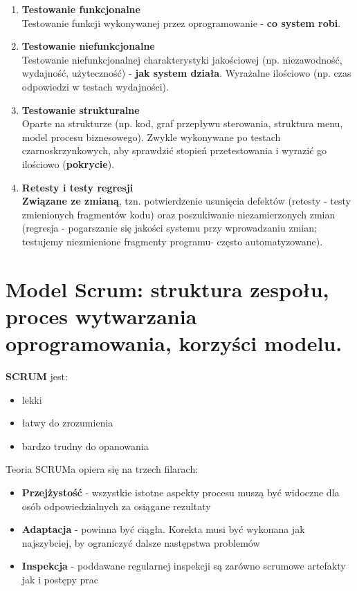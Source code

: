 \documentclass[12pt]{article}
\begin{document}
    \begin{enumerate}
        \item  \textbf{Testowanie funkcjonalne}\\
        Testowanie funkcji wykonywanej przez oprogramowanie - \textbf{co system robi}.

        \item \textbf{Testowanie niefunkcjonalne}\\
        Testowanie niefunkcjonalnej charakterystyki jakościowej (np. niezawodność, wydajność,
        użyteczność) - \textbf{jak system działa}. Wyrażalne ilościowo (np. czas odpowiedzi w testach wydajności).

        \item \textbf{Testowanie strukturalne}\\
        Oparte na strukturze (np. kod, graf przepływu sterowania, struktura menu, model procesu biznesowego).
        Zwykle wykonywane po testach czarnoskrzynkowych, aby sprawdzić stopień przetestowania i wyrazić go ilościowo
        (\textbf{pokrycie}).

        \item \textbf{Retesty i testy regresji}\\
        \textbf{Związane ze zmianą}, tzn. potwierdzenie usunięcia defektów (retesty - testy zmienionych fragmentów kodu)
        oraz poszukiwanie niezamierzonych zmian (regresja - pogarszanie się jakości systemu przy wprowadzaniu zmian;
        testujemy niezmienione fragmenty programu- często automatyzowane).
    \end{enumerate}

    \newpage

    \section{Model Scrum: struktura zespołu, proces wytwarzania oprogramowania, korzyści modelu.}
    \begin{definition}
        \textbf{SCRUM} jest:
        \begin{itemize}
            \item lekki
            \item łatwy do zrozumienia
            \item bardzo trudny do opanowania
        \end{itemize}

        Teoria SCRUMa opiera się na trzech filarach:
        \begin{itemize}
            \item \textbf{Przejżystość} - wszystkie istotne aspekty procesu muszą być widoczne dla osób odpowiedzialnych za osiągane rezultaty
            \item \textbf{Adaptacja} - powinna być ciągła. Korekta musi być wykonana jak najszybciej, by ograniczyć dalsze następstwa problemów
            \item \textbf{Inspekcja} - poddawane regularnej inspekcji są zarówno scrumowe artefakty jak i postępy prac
        \end{itemize}
    \end{definition}
\end{document}
